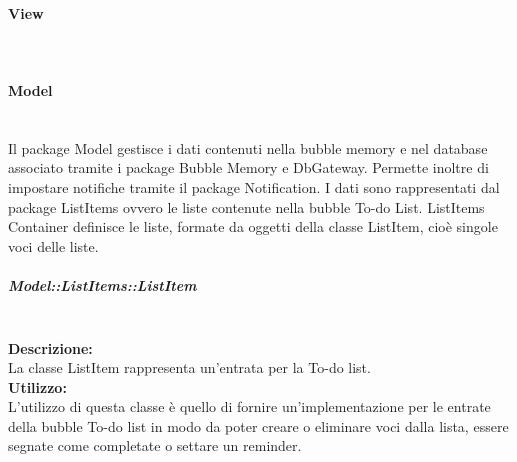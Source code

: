 
\begin{samepage}
\paragraph{View}\mbox{}\\
\end{samepage}

\paragraph{Model}\mbox{}\\
Il package Model gestisce i dati contenuti nella bubble memory e nel database associato tramite i package Bubble Memory e Db\-Gateway. Permette inoltre di impostare notifiche tramite il package Notification. I dati sono rappresentati dal package List\-Items ovvero le liste contenute nella bubble To-do List. List\-Items Container definisce le liste, formate da oggetti della classe List\-Item, cioè singole voci delle liste. 


\subparagraph{Model\-::List\-Items\-::List\-Item}\label{todo-item}\mbox{}\\
\textbf{Descrizione:}\\
La classe List\-Item rappresenta un'entrata per la To-do list.\\
\textbf{Utilizzo:}\\
L'utilizzo di questa classe è quello di fornire un'implementazione per le entrate della bubble To-do list in modo da poter creare o eliminare voci dalla lista, essere segnate come completate o settare un reminder.\\

